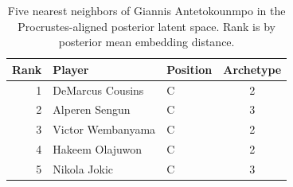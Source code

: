 \begin{table}[htbp]
  \centering\small
  \begin{tabular}{rllc}
    \toprule
    Rank & Player & Position & Archetype \\
    \midrule
    1 & DeMarcus Cousins & C & 2 \\
    2 & Alperen Sengun & C & 3 \\
    3 & Victor Wembanyama & C & 2 \\
    4 & Hakeem Olajuwon & C & 2 \\
    5 & Nikola Jokic & C & 3 \\
    \bottomrule
  \end{tabular}
  \caption{Five nearest neighbors of Giannis Antetokounmpo in the Procrustes-aligned posterior latent space. Rank is by posterior mean embedding distance.}
  \label{tab:Giannis_Antetokounmpo_neighbors}
\end{table}

